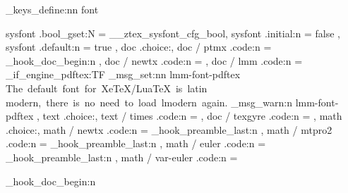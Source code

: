 \ztex_keys_define:nn { font }{
  sysfont         .bool_gset:N  = \g__ztex_sysfont_cfg_bool,
  sysfont         .initial:n    = { false },
  sysfont         .default:n    = { true },
  doc             .choice:,
  doc / ptmx      .code:n       = {
    \RequirePackage{mathptmx}
    \RequirePackage{newtxtext}
    \ztex_hook_doc_begin:n
      {
        \let\pi\new@pi
        \let\jmath\new@jmath
        \let\amalg\new@amalg
        \let\coprod\new@coprod
      }
  },
  doc / newtx    .code:n       = {
    \RequirePackage{newtxtext}
    \RequirePackage{newtxmath}
  },
  doc / lmm       .code:n      = {
    \sys_if_engine_pdftex:TF 
      { 
        \RequirePackage{lmodern}
        \RequirePackage{fixcmex} 
      }{ 
        \ztex_msg_set:nn {lmm-font-pdftex}
          {
            The~default~font~for~XeTeX/LuaTeX~is~latin~
            modern,~there~is~no~need~to~load~lmodern~again.
          }
        \ztex_msg_warn:n {lmm-font-pdftex} 
      }
  },
  text            .choice:,
  text / times    .code:n       = { \RequirePackage{newtxtext} },
  doc / texgyre   .code:n       = {  },  %
  math            .choice:,
  math / newtx    .code:n       = {
    \ztex_hook_preamble_last:n { \RequirePackage{newtxmath} } 
  },
  math / mtpro2   .code:n       = { 
    \ztex_hook_preamble_last:n { 
    } 
  },
  math / euler    .code:n       = { 
    \ztex_hook_preamble_last:n {  } 
  },
  math / var-euler .code:n       = {
    \usepackage[OT1]{eulervm}
    \ztex_hook_doc_begin:n
      {
        \DeclareRobustCommand\int {\new@int}
}}}
